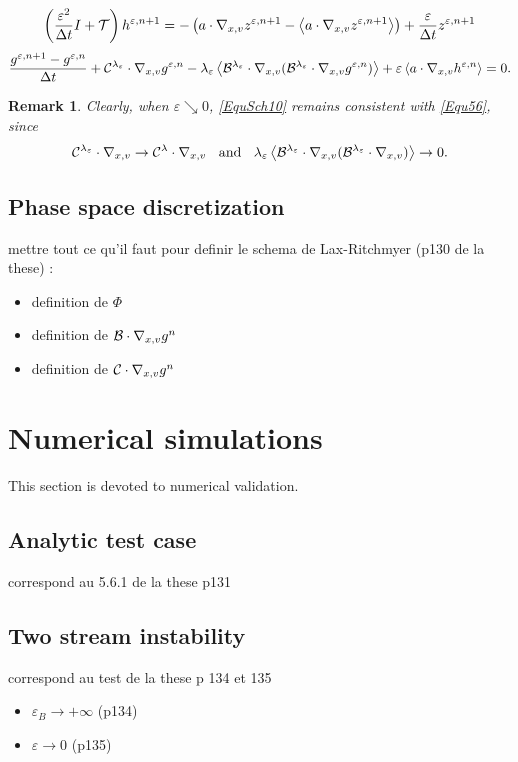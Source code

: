 \documentclass[12pt, a4paper]{article}
\newtheorem{remark}{Remark}[section]
\newcounter{Remark}
\newcommand{\ble}[0]{
{\cal B}^{\lambda _\varepsilon}}
\newcommand{\cl}[0]{
{\cal C} ^\lambda}
\newcommand{\cle}[0]{
{\cal C}^{\lambda _\varepsilon}}
\newcommand{\eps}[0]{
\varepsilon}
\newcommand{\zenpo}[0]{
z ^{\varepsilon, n + 1}}
\newcommand{\hen}[0]{
h ^{\varepsilon, n}}
\newcommand{\henpo}[0]{
h ^{\varepsilon, n + 1}}
\newcommand{\gen}[0]{
g ^{\varepsilon, n}}
\newcommand{\genpo}[0]{
g ^{\varepsilon, n + 1}}
\newcommand{\nxv}[0]{
\nabla_{x,v}}
\newcommand{\ave}[1]{
\left \langle #1 \right \rangle }
\begin{document}
{\begin{enumerate}
\begin{align}
\label{EquSch9}
\left (  \frac{\eps ^2}{\Delta t}I + {\cal T}\right )\henpo = 
- \left ( 
a \cdot \nxv \zenpo- \ave{a \cdot \nxv \zenpo} 
\right ) + 
\frac{\eps}{\Delta t} 
\zenpo
\end{align}
\begin{align}
\label{EquSch10}
\frac{\genpo - \gen}{\Delta t} + \cle \cdot \nxv \gen - \lambda _\eps \ave{\ble \cdot \nxv ( \ble \cdot \nxv \gen )} +  \eps\ave{a \cdot \nxv \hen} = 0.
\end{align}
\end{enumerate}
\begin{remark}
Clearly, when $\eps \searrow 0$, \eqref{EquSch10} remains consistent with \eqref{Equ56}, since
\[
\cle \cdot \nxv \to \cl \cdot \nxv\;\;\mbox{ and } \;\;\lambda _\eps \ave{\ble \cdot \nxv ( \ble \cdot \nxv )} \to 0.
\]
\end{remark}
}



\subsection{Phase space discretization}

mettre tout ce qu'il faut pour definir le schema de Lax-Ritchmyer (p130 de la these) : 
\begin{itemize}
\item definition de $\Phi$ 
\item definition de ${\cal B}\cdot \nabla_{x,v} g^n$
\item definition de ${\cal C}\cdot \nabla_{x,v} g^n$
\end{itemize}


\section{Numerical simulations}
\label{NumSim}

This section is devoted to numerical validation. 

\subsection{Analytic test case}
correspond au 5.6.1 de la these p131

\subsection{Two stream instability}
correspond au test  de la these p 134 et 135 
\begin{itemize}
\item $\varepsilon_B  \rightarrow +\infty$ (p134)
\item $\varepsilon  \rightarrow 0$ (p135)
\end{itemize}
\end{document}
